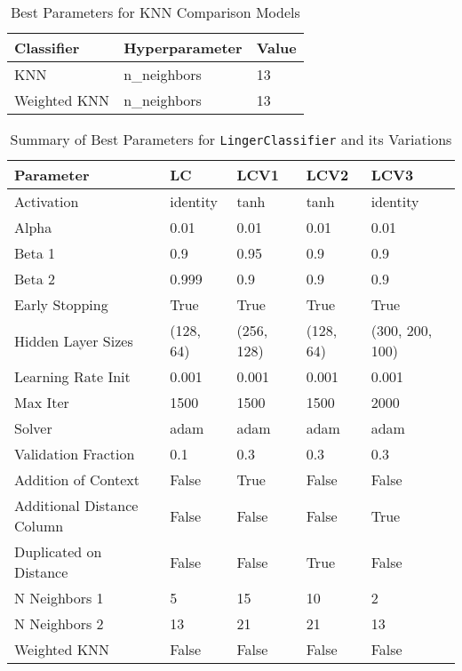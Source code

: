 \documentclass[a4paper, 12pt]{report}
\begin{document}
\begin{table}[H]
    \centering
    \caption{Best Parameters for KNN Comparison Models}
    \label{tab:best_parameters_combined_knn_exp3}
    \begin{tabular}{|l|l|l|}
    \toprule
    \textbf{Classifier} & \textbf{Hyperparameter} & \textbf{Value} \\
    \midrule
    KNN & n\_neighbors & 13 \\
    Weighted KNN & n\_neighbors & 13 \\
    \bottomrule
\end{tabular}
\end{table}

\begin{table}[H]
    \centering
    \caption{Summary of Best Parameters for \texttt{LingerClassifier} and its Variations}
    \label{tab:best_parameters_summary_exp3}
    \begin{tabular}{|l|l|l|l|l|}
    \hline
    \textbf{Parameter} & \textbf{LC} & \textbf{LCV1} & \textbf{LCV2} & \textbf{LCV3} \\
    \hline
    Activation & identity & tanh & tanh & identity \\
    Alpha & 0.01 & 0.01 & 0.01 & 0.01 \\
    Beta 1 & 0.9 & 0.95 & 0.9 & 0.9 \\
    Beta 2 & 0.999 & 0.9 & 0.9 & 0.9 \\
    Early Stopping & True & True & True & True \\
    Hidden Layer Sizes & (128, 64) & (256, 128) & (128, 64) & (300, 200, 100) \\
    Learning Rate Init & 0.001 & 0.001 & 0.001 & 0.001 \\
    Max Iter & 1500 & 1500 & 1500 & 2000 \\
    Solver & adam & adam & adam & adam \\
    Validation Fraction & 0.1 & 0.3 & 0.3 & 0.3 \\
    Addition of Context & False & True & False & False \\
    Additional Distance Column & False & False & False & True \\
    Duplicated on Distance & False & False & True & False \\
    N Neighbors 1 & 5 & 15 & 10 & 2 \\
    N Neighbors 2 & 13 & 21 & 21 & 13 \\
    Weighted KNN & False & False & False & False \\
    \hline
    \end{tabular}
\end{table}
\end{document}
